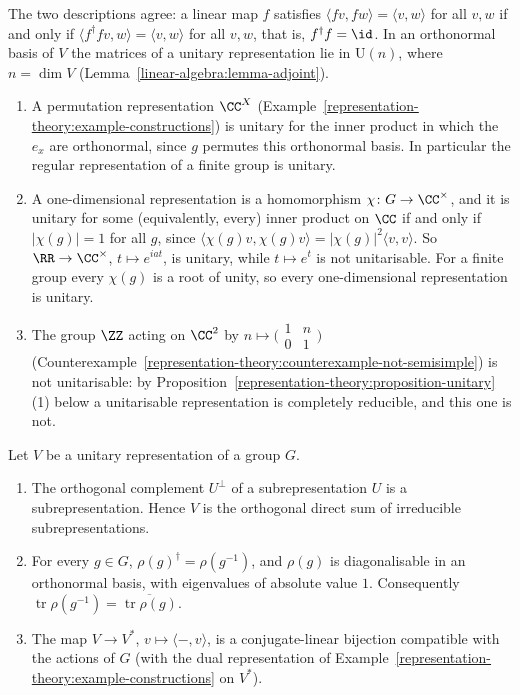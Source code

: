 The two descriptions agree: a linear map $f$ satisfies $\langle fv, fw\rangle = \langle v, w\rangle$ for all $v, w$ if and only if $\langle f^\dagger fv, w\rangle = \langle v, w\rangle$ for all
$v, w$, that is, $f^\dagger f = \id$. In an orthonormal basis of $V$ the matrices of a unitary representation lie in $\mathrm{U}(n)$, where $n = \dim V$
(Lemma~\ref{linear-algebra:lemma-adjoint}).

\begin{example}\label{representation-theory:example-unitary}
\begin{enumerate}
\item A permutation representation $\CC^X$ (Example~\ref{representation-theory:example-constructions}) is unitary for the inner product in which the $e_x$ are orthonormal, since $g$ permutes
this orthonormal basis. In particular the regular representation of a finite group is unitary.
\item A one-dimensional representation is a homomorphism $\chi \colon G \to \CC^\times$, and it is unitary for some (equivalently, every) inner product on $\CC$ if and only if $|\chi(g)| = 1$
for all $g$, since $\langle \chi(g)v, \chi(g)v\rangle = |\chi(g)|^2\langle v, v\rangle$. So $\RR \to \CC^\times$, $t \mapsto e^{iat}$, is unitary, while $t \mapsto e^t$ is not unitarisable.
For a finite group every $\chi(g)$ is a root of unity, so every one-dimensional representation is unitary.
\item The group $\ZZ$ acting on $\CC^2$ by $n \mapsto \bigl(\begin{smallmatrix}1 & n\\ 0 & 1\end{smallmatrix}\bigr)$ (Counterexample~\ref{representation-theory:counterexample-not-semisimple}) is
not unitarisable: by Proposition~\ref{representation-theory:proposition-unitary}(1) below a unitarisable representation is completely reducible, and this one is not.
\end{enumerate}
\end{example}

\begin{proposition}\label{representation-theory:proposition-unitary}
Let $V$ be a unitary representation of a group $G$.
\begin{enumerate}
\item The orthogonal complement $U^\perp$ of a subrepresentation $U$ is a subrepresentation. Hence $V$ is the orthogonal direct sum of irreducible subrepresentations.
\item For every $g \in G$, $\rho(g)^\dagger = \rho(g^{-1})$, and $\rho(g)$ is diagonalisable in an orthonormal basis, with eigenvalues of absolute value $1$. Consequently
$\operatorname{tr}\rho(g^{-1}) = \overline{\operatorname{tr}\rho(g)}$.
\item The map $V \to V^*$, $v \mapsto \langle -, v\rangle$, is a conjugate-linear bijection compatible with the actions of $G$ (with the dual representation of
Example~\ref{representation-theory:example-constructions} on $V^*$).
\end{enumerate}
\end{proposition}

